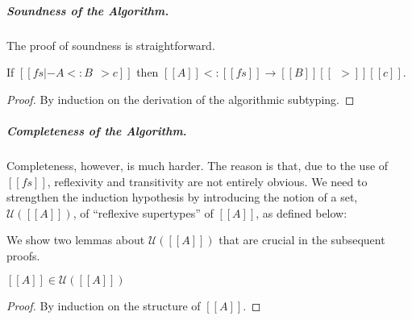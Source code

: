 \subparagraph{Soundness of the Algorithm.}




The proof of soundness is straightforward.
\begin{theorem}[Soundness] \label{thm:soundness}
  If $[[ fs |- A <: B ~~> c]]$ then $[[A]] <: [[fs]] \rightarrow [[B]] [[~~>]] [[c]]$.
\end{theorem}
\begin{proof}
  By induction on the derivation of the algorithmic subtyping.
\end{proof}


\subparagraph{Completeness of the Algorithm.}


\newcommand{\U}[1]{\mathcal{U}(#1)}

Completeness, however, is much harder. The reason is that, due to the use of
$[[fs]]$, reflexivity and transitivity are not entirely obvious. We need to
strengthen the induction hypothesis by introducing the notion of a set,
$\U{[[A]]}$, of ``reflexive supertypes'' of $[[A]]$, as defined below:
We show two lemmas about $\U{[[A]]}$ that are crucial in the subsequent proofs.
\begin{lemma} \label{lemma:set_refl}
  $[[A]] \in \U{[[A]]}$
\end{lemma}
\begin{proof}
  By induction on the structure of $[[A]]$.
\end{proof}

